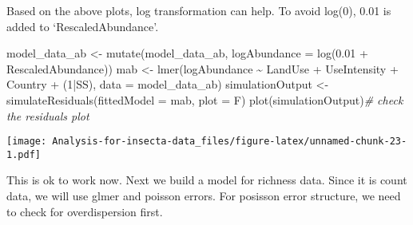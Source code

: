 \documentclass[
]{article}
\newenvironment{Shaded}{\begin{snugshade}}{\end{snugshade}}
\newcommand{\AttributeTok}[1]{\textcolor[rgb]{0.77,0.63,0.00}{#1}}
\newcommand{\CommentTok}[1]{\textcolor[rgb]{0.56,0.35,0.01}{\textit{#1}}}
\newcommand{\DecValTok}[1]{\textcolor[rgb]{0.00,0.00,0.81}{#1}}
\newcommand{\FloatTok}[1]{\textcolor[rgb]{0.00,0.00,0.81}{#1}}
\newcommand{\FunctionTok}[1]{\textcolor[rgb]{0.00,0.00,0.00}{#1}}
\newcommand{\NormalTok}[1]{#1}
\newcommand{\OtherTok}[1]{\textcolor[rgb]{0.56,0.35,0.01}{#1}}
\newcommand{\SpecialCharTok}[1]{\textcolor[rgb]{0.00,0.00,0.00}{#1}}
\begin{document}
Based on the above plots, log transformation can help. To avoid log(0),
0.01 is added to `RescaledAbundance'.

\begin{Shaded}
\begin{Highlighting}[]
\NormalTok{model\_data\_ab }\OtherTok{\textless{}{-}} \FunctionTok{mutate}\NormalTok{(model\_data\_ab, }
                        \AttributeTok{logAbundance =} \FunctionTok{log}\NormalTok{(}\FloatTok{0.01} \SpecialCharTok{+}\NormalTok{ RescaledAbundance))}
\NormalTok{mab }\OtherTok{\textless{}{-}} \FunctionTok{lmer}\NormalTok{(logAbundance }\SpecialCharTok{\textasciitilde{}}\NormalTok{ LandUse }\SpecialCharTok{+}\NormalTok{ UseIntensity }\SpecialCharTok{+}\NormalTok{ Country }\SpecialCharTok{+}\NormalTok{ (}\DecValTok{1}\SpecialCharTok{|}\NormalTok{SS), }\AttributeTok{data =}\NormalTok{ model\_data\_ab)}
\NormalTok{simulationOutput }\OtherTok{\textless{}{-}}\FunctionTok{simulateResiduals}\NormalTok{(}\AttributeTok{fittedModel =}\NormalTok{ mab, }\AttributeTok{plot =}\NormalTok{ F)}
\FunctionTok{plot}\NormalTok{(simulationOutput)}\CommentTok{\# check the residuals plot}
\end{Highlighting}
\end{Shaded}

\texttt{[image: Analysis-for-insecta-data\_files/figure-latex/unnamed-chunk-23-1.pdf]}

This is ok to work now. Next we build a model for richness data. Since
it is count data, we will use glmer and poisson errors. For posisson
error structure, we need to check for overdispersion first.
\end{document}
